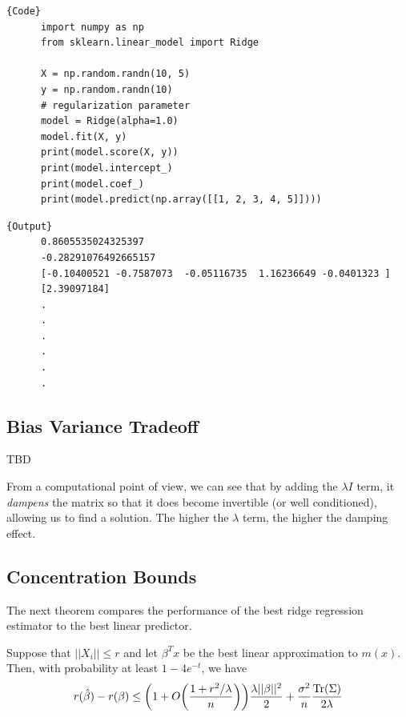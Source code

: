   \begin{code}
    \noindent\begin{minipage}{.6\textwidth}
    \begin{lstlisting}[]{Code}
      import numpy as np 
      from sklearn.linear_model import Ridge  

      X = np.random.randn(10, 5) 
      y = np.random.randn(10)
      # regularization parameter
      model = Ridge(alpha=1.0)  
      model.fit(X, y) 
      print(model.score(X, y))  
      print(model.intercept_)
      print(model.coef_) 
      print(model.predict(np.array([[1, 2, 3, 4, 5]]))) 
    \end{lstlisting}
    \end{minipage}
    \hfill
    \begin{minipage}{.39\textwidth}
    \begin{lstlisting}[]{Output}
      0.8605535024325397
      -0.28291076492665157
      [-0.10400521 -0.7587073  -0.05116735  1.16236649 -0.0401323 ]
      [2.39097184]
      .
      .
      .
      .
      .
      .
    \end{lstlisting}
    \end{minipage}
  \end{code}

\subsection{Bias Variance Tradeoff}

  \begin{theorem}
    TBD 
  \end{theorem}

  From a computational point of view, we can see that by adding the $\lambda I$ term, it \textit{dampens} the matrix so that it does become invertible (or well conditioned), allowing us to find a solution. The higher the $\lambda$ term, the higher the damping effect. 

\subsection{Concentration Bounds}

  The next theorem compares the performance of the best ridge regression estimator to the best linear predictor. 

  \begin{theorem} 
    Suppose that $||X_i|| \leq r$ and let $\beta^T x$ be the best linear approximation to $m(x)$. Then, with probability at least $1 - 4 e^{-t}$, we have
    \begin{equation}
      r(\hat{\beta}) - r(\beta) \leq \bigg( 1 + O \bigg( \frac{1 + r^2 / \lambda}{n} \bigg) \bigg) \frac{\lambda ||\beta||^2}{2} + \frac{\sigma^2}{n} \frac{\Tr(\Sigma)}{2 \lambda}
    \end{equation}
  \end{theorem}

